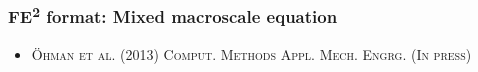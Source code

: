 \documentclass[11pt]{beamer} %
\renewcommand{\dev}{\mathrm{d}}
\newcommand{\roughcite}[1]{\textsc{#1}}
\begin{document}
\begin{frame}
 \frametitle{FE\textsuperscript{2} format: Mixed macroscale equation}
% 
% 

 \begin{center}
 
 \end{center}
\vspace{-6truemm}
 \begin{itemize}
   \item \roughcite{\"Ohman et al. (2013) Comput. Methods Appl. Mech. Engrg. (In press)}
 \end{itemize}

\end{frame}
\end{document}
